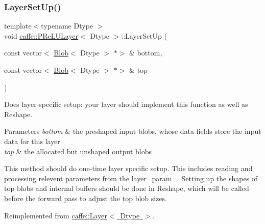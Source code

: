 \subsubsection{\texorpdfstring{Layer\+Set\+Up()}{LayerSetUp()}\hspace{0.1cm}{\footnotesize\ttfamily [2/2]}}
{\footnotesize\ttfamily template$<$typename Dtype $>$ \\
void \mbox{\hyperlink{classcaffe_1_1_p_re_l_u_layer}{caffe\+::\+P\+Re\+L\+U\+Layer}}$<$ Dtype $>$\+::Layer\+Set\+Up (\begin{DoxyParamCaption}\item[{const vector$<$ \mbox{\hyperlink{classcaffe_1_1_blob}{Blob}}$<$ Dtype $>$ $\ast$$>$ \&}]{bottom,  }\item[{const vector$<$ \mbox{\hyperlink{classcaffe_1_1_blob}{Blob}}$<$ Dtype $>$ $\ast$$>$ \&}]{top }\end{DoxyParamCaption})\hspace{0.3cm}{\ttfamily [virtual]}}



Does layer-\/specific setup\+: your layer should implement this function as well as Reshape. 


\begin{DoxyParams}{Parameters}
{\em bottom} & the preshaped input blobs, whose data fields store the input data for this layer \\
\hline
{\em top} & the allocated but unshaped output blobs\\
\hline
\end{DoxyParams}
This method should do one-\/time layer specific setup. This includes reading and processing relevent parameters from the {\ttfamily layer\+\_\+param\+\_\+}. Setting up the shapes of top blobs and internal buffers should be done in {\ttfamily Reshape}, which will be called before the forward pass to adjust the top blob sizes. 

Reimplemented from \mbox{\hyperlink{classcaffe_1_1_layer_a481323a3e0972c682787f2137468c29f}{caffe\+::\+Layer$<$ Dtype $>$}}.

\mbox{\label{classcaffe_1_1_p_re_l_u_layer_a923c7c14b470ff84a9b8ee4a93395b5d}} 
